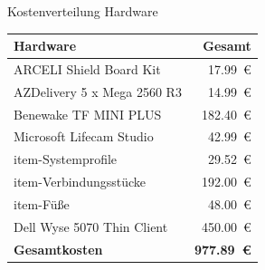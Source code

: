 \documentclass[10pt,ngerman]{beamer}
\begin{document}


\begin{frame}[fragile]{Kostenverteilung Hardware}
  \begin{table}[htbp]
    \centering
    \begin{tabular}{lr}
      \textbf{Hardware}           & \textbf{Gesamt}         \\ \hline
      ARCELI Shield Board Kit     & \SI{17.99}{€}           \\
      AZDelivery 5 x Mega 2560 R3 & \SI{14.99}{€}           \\
      Benewake TF MINI PLUS       & \SI{182.40}{€}          \\
      Microsoft Lifecam Studio    & \SI{42.99}{€}           \\
      item-Systemprofile          & \SI{29.52}{€}           \\
      item-Verbindungsstücke      & \SI{192.00}{€}          \\
      item-Füße                   & \SI{48.00}{€}           \\
      Dell Wyse 5070 Thin Client  & \SI{450.00}{€}          \\
      \hline
      \textbf{Gesamtkosten}       & \textbf{\SI{977.89}{€}}
    \end{tabular}
  \end{table}
\end{frame}

\end{document}
